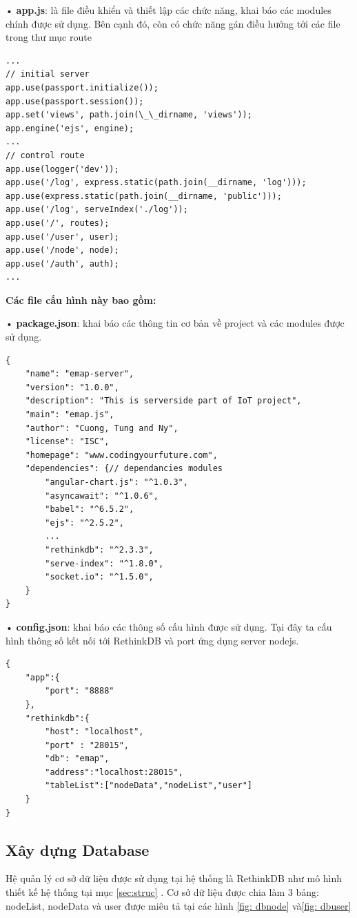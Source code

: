 • \textbf{app.js}: là file điều khiển và thiết lập các chức năng, khai báo các modules chính được sử dụng. Bên cạnh đó, còn có chức năng gán điều hướng tới các file trong thư mục route
\begin{lstlisting}[caption=app.js]
...
// initial server
app.use(passport.initialize());
app.use(passport.session());
app.set('views', path.join(\_\_dirname, 'views'));
app.engine('ejs', engine);
...
// control route
app.use(logger('dev'));
app.use('/log', express.static(path.join(__dirname, 'log')));
app.use(express.static(path.join(__dirname, 'public')));
app.use('/log', serveIndex('./log'));
app.use('/', routes);
app.use('/user', user);
app.use('/node', node);
app.use('/auth', auth);
...
\end{lstlisting}

\textbf{Các file cấu hình này bao gồm:}

• \textbf{package.json}: khai báo các thông tin cơ bản về project và các modules được sử dụng.
\begin{Verbatim}[xleftmargin=2em]
{
	"name": "emap-server",
	"version": "1.0.0",
	"description": "This is serverside part of IoT project",
	"main": "emap.js",
	"author": "Cuong, Tung and Ny",
	"license": "ISC",
	"homepage": "www.codingyourfuture.com",
	"dependencies": {// dependancies modules
		"angular-chart.js": "^1.0.3",
		"asyncawait": "^1.0.6",
		"babel": "^6.5.2",
		"ejs": "^2.5.2",
		...
		"rethinkdb": "^2.3.3",
		"serve-index": "^1.8.0",
		"socket.io": "^1.5.0",
	}
}
\end{Verbatim}
• \textbf{config.json}: khai báo các thông số cấu hình được sử dụng. Tại đây ta cấu hình thông số kết nối tới RethinkDB và port ứng dụng server nodejs.
\begin{Verbatim}[xleftmargin=2em]
{
	"app":{
		"port": "8888"
	},
	"rethinkdb":{
		"host": "localhost",
		"port" : "28015",
		"db": "emap",
		"address":"localhost:28015",
		"tableList":["nodeData","nodeList","user"]
	}
}

\end{Verbatim}





\subsection{Xây dựng Database}
Hệ quản lý cơ sở dữ liệu được sử dụng tại hệ thống là RethinkDB như mô hình thiết kế hệ thống tại mục \ref{sec:struc} . Cơ sở dữ liệu được chia làm 3 bảng: nodeList, nodeData và user được miêu tả tại các hình \ref{fig: dbnode} và\ref{fig: dbuser}

